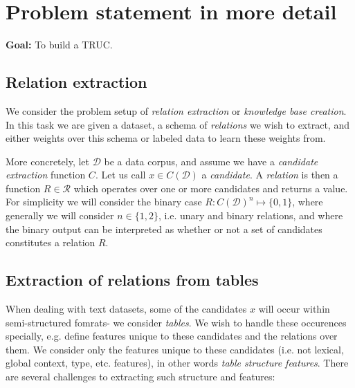\documentclass[11pt]{article} %
\begin{document}
\section{Problem statement in more detail}



\textbf{Goal:} To build a TRUC.

\subsection{Relation extraction}
We consider the problem setup of \textit{relation extraction} or \textit{knowledge base creation}.  In this task we are given a dataset, a schema of \textit{relations} we wish to extract, and either weights over this schema or labeled data to learn these weights from.

More concretely, let $\mathcal{D}$ be a data corpus, and assume we have a \textit{candidate extraction} function $C$.  Let us call $x\in C(\mathcal{D})$ a \textit{candidate}.  A \textit{relation} is then a function $R\in\mathcal{R}$ which operates over one or more candidates and returns a value.  For simplicity we will consider the binary case $R : C(\mathcal{D})^n \mapsto \{0,1\}$, where generally we will consider $n\in\{1,2\}$, i.e. unary and binary relations, and where the binary output can be interpreted as whether or not a set of candidates constitutes a relation $R$.

\subsection{Extraction of relations from tables}
When dealing with text datasets, some of the candidates $x$ will occur within semi-structured fomrats- we consider \textit{tables}.  We wish to handle these occurences specially, e.g. define features unique to these candidates and the relations over them.  We consider only the features unique to these candidates (i.e. not lexical, global context, type, etc. features), in other words \textit{table structure features}. There are several challenges to extracting such structure and features:
\end{document}
